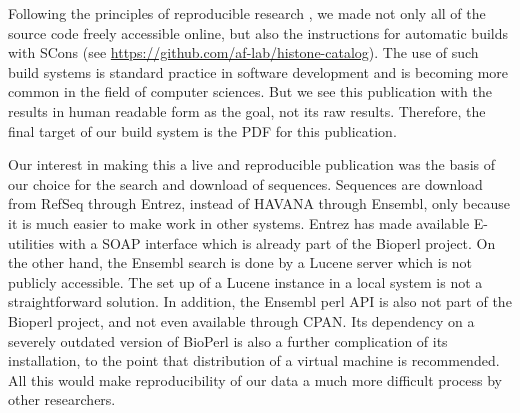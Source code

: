   Following the principles of reproducible research
  \citep{reproducible-research-bioinformatics, reproducible-research-law}, we made
  not only all of the source code freely accessible online, but also the instructions
  for automatic builds with SCons\citep{SCons2005}
  (see \url{https://github.com/af-lab/histone-catalog}). The use of such build systems is
  standard practice in software development and is becoming more common in the field
  of computer sciences. But we see this publication with the results in human readable
  form as the goal, not its raw results. Therefore, the final target of our build system is
  the PDF for this publication.



  Our interest in making this a live and reproducible publication was the basis of
  our choice for the search and download of sequences. Sequences are download from
  RefSeq through Entrez, instead of HAVANA through Ensembl, only because it is much
  easier to make work in other systems. Entrez has made available E-utilities with
  a SOAP interface which is already part of the Bioperl project.
  On the other hand, the Ensembl search is done by a Lucene server which is not publicly
  accessible. The set up of a Lucene instance in a local system is not a straightforward
  solution.
  In addition, the Ensembl perl API is also not part of the Bioperl project, and not
  even available through CPAN. Its dependency on a severely outdated version of BioPerl
  is also a further complication of its installation, to the point that distribution of
  a virtual machine is recommended.
  All this would make reproducibility
  of our data a much more difficult process by other researchers.


